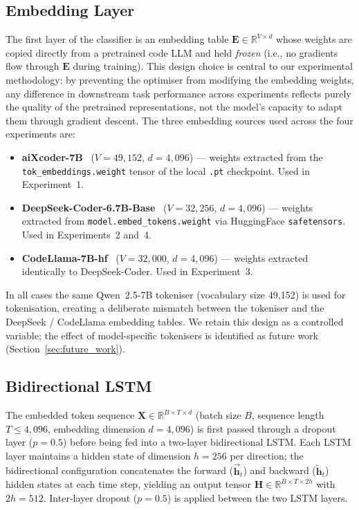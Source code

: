 \subsection{Embedding Layer}
\label{sec:embedding}

The first layer of the classifier is an embedding table
$\mathbf{E} \in \mathbb{R}^{V \times d}$ whose weights are copied directly
from a pretrained code LLM and held \emph{frozen} (i.e., no gradients flow
through $\mathbf{E}$ during training).
This design choice is central to our experimental methodology: by preventing
the optimiser from modifying the embedding weights, any difference in
downstream task performance across experiments reflects purely the quality of
the pretrained representations, not the model's capacity to adapt them
through gradient descent.
The three embedding sources used across the four experiments are:

\begin{itemize}
  \item \textbf{aiXcoder-7B}~\cite{aixcoder}
        ($V = 49{,}152$, $d = 4{,}096$) — weights extracted from the
        \texttt{tok\_embeddings.weight} tensor of the local \texttt{.pt}
        checkpoint.  Used in Experiment~1.

  \item \textbf{DeepSeek-Coder-6.7B-Base}~\cite{deepseek}
        ($V = 32{,}256$, $d = 4{,}096$) — weights extracted from
        \texttt{model.embed\_tokens.weight} via HuggingFace \texttt{safetensors}.
        Used in Experiments~2 and~4.

  \item \textbf{CodeLlama-7B-hf}~\cite{rozière2024codellamaopenfoundation}
        ($V = 32{,}000$, $d = 4{,}096$) — weights extracted identically to
        DeepSeek-Coder.  Used in Experiment~3.
\end{itemize}

\noindent
In all cases the same Qwen~2.5-7B tokeniser (vocabulary size 49{,}152) is
used for tokenisation, creating a deliberate mismatch between the tokeniser
and the DeepSeek / CodeLlama embedding tables.
We retain this design as a controlled variable; the effect of model-specific
tokenisers is identified as future work (Section~\ref{sec:future_work}).

\subsection{Bidirectional LSTM}
\label{sec:lstm}

The embedded token sequence
$\mathbf{X} \in \mathbb{R}^{B \times T \times d}$ (batch size $B$, sequence
length $T \leq 4{,}096$, embedding dimension $d = 4{,}096$) is first passed
through a dropout layer ($p = 0.5$) before being fed into a two-layer
bidirectional LSTM.
Each LSTM layer maintains a hidden state of dimension $h = 256$ per
direction; the bidirectional configuration concatenates the forward
($\overrightarrow{\mathbf{h}}_t$) and backward
($\overleftarrow{\mathbf{h}}_t$) hidden states at each time step, yielding
an output tensor
$\mathbf{H} \in \mathbb{R}^{B \times T \times 2h}$ with $2h = 512$.
Inter-layer dropout ($p = 0.5$) is applied between the two LSTM layers.

